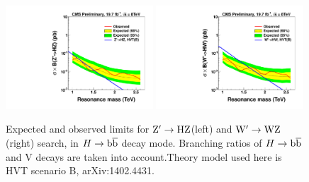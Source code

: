 \begin{figure}[ht!pb]
\begin{center}
\includegraphics[width=0.49\textwidth]{EXO-14-009/brazilianFlag_HbbZqqHPLP.pdf}
\includegraphics[width=0.49\textwidth]{EXO-14-009/brazilianFlag_HbbWqqHPLP.pdf}
\end{center}
\caption{Expected and observed limits for ${\rm Z'\to HZ}$(left) and ${\rm W' \to WZ}$(right)
 search, in $H\to\mathrm{b\overline{b}}$ decay mode. Branching ratios of $H\to\mathrm{b\overline{b}}$ and V decays are
 taken into account.Theory model used here is HVT scenario B, arXiv:1402.4431.
}
\label{fig:HbbVCombined}
\end{figure}



\clearpage
